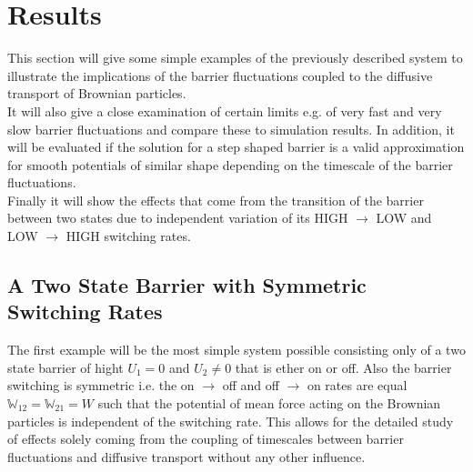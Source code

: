\newpage
\section{Results}
This section will give some simple examples of the previously described system to illustrate the implications of the barrier fluctuations coupled to the diffusive transport of Brownian particles.\\
It will also give a close examination of certain limits e.g. of very fast and very slow barrier fluctuations and compare these to simulation results. In addition, it will be evaluated if the solution for a step shaped barrier is a valid approximation for smooth potentials of similar shape depending on the timescale of the barrier fluctuations. \\
Finally it will show the effects that come from the transition of the barrier between two states due to independent variation of its HIGH $\rightarrow$ LOW and LOW $\rightarrow$ HIGH switching rates.
\subsection{A Two State Barrier with Symmetric Switching Rates}
The first example will be the most simple system possible consisting only of a two state barrier of hight $U_1 = 0$ and $U_2 \ne 0$ that is ether on or off. Also the barrier switching is symmetric i.e. the on $\rightarrow$ off and off $\rightarrow$ on rates are equal $\mathbb{W}_{12}=\mathbb{W}_{21}=W$ such that the potential of mean force acting on the Brownian particles is independent of the switching rate.
This allows for the detailed study of effects solely coming from the coupling of timescales between barrier fluctuations and diffusive transport without any other influence.

